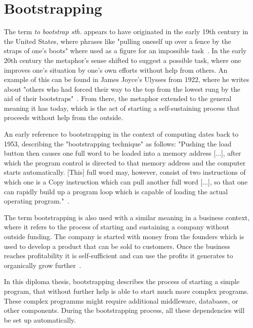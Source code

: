 \section{Bootstrapping}
\label{fundamentals:bootstrapping}

The term \textit{to bootstrap sth.} appears to have originated in the early 19th century in the United States, where phrases like "pulling oneself up over a fence by the straps of one's boots" where used as a figure for an impossible task~\autocite{bootstrap:history}.
In the early 20th century the metaphor's sense shifted to suggest a possible task, where one improves one's situation by one's own efforts without help from others.
An example of this can be found in James Joyce's Ulysses from 1922, where he writes about "others who had forced their way to the top from the lowest rung by the aid of their bootstraps"~\autocite{bootstrap:ulysses}.
From there, the metaphor extended to the general meaning it has today, which is the act of starting a self-sustaining process that proceeds without help from the outside.

An early reference to bootstrapping in the context of computing dates back to 1953, describing the "bootstrapping technique" as follows: "Pushing the load button then causes one full word to be loaded into a memory address [...], after which the program control is directed to that memory address and the computer starts automatically. [This] full word may, however, consist of two instructions of which one is a Copy instruction which can pull another full word [...], so that one can rapidly build up a program loop which is capable of loading the actual operating program."~\autocite{bootstrap:early}.

The term bootstrapping is also used with a similar meaning in a business context, where it refers to the process of starting and sustaining a company without outside funding.
The company is started with money from the founders which is used to develop a product that can be sold to customers.
Once the business reaches profitability it is self-sufficient and can use the profits it generates to organically grow further~\autocite{bootstrap:business}.

In this diploma thesis, bootstrapping describes the process of starting a simple program, that without further help is able to start much more complex programs.
These complex programms might require additional middleware, databases, or other components.
During the bootstrapping process, all these dependencies will be set up automatically.
